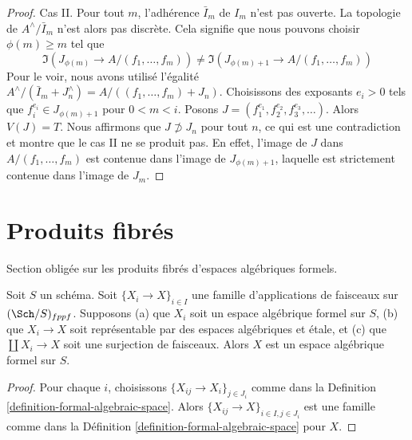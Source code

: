 \begin{proof}
\medskip\noindent
Cas II. Pour tout $m$, l'adhérence $\bar I_m$ de $I_m$ n'est pas ouverte.
La topologie de $A^\wedge/\bar I_m$ n'est alors pas discrète. Cela signifie
que nous pouvons choisir $\phi(m) \geq m$ tel que
$$
\Im(J_{\phi(m)} \to A/(f_1, \ldots, f_m)) \not =
\Im(J_{\phi(m) + 1} \to A/(f_1, \ldots, f_m))
$$
Pour le voir, nous avons utilisé l'égalité
$A^\wedge/(\bar I_m + J_n^\wedge) = A/((f_1, \ldots, f_m) + J_n)$.
Choisissons des exposants $e_i > 0$ tels que $f_i^{e_i} \in J_{\phi(m) + 1}$
pour $0 < m < i$. Posons $J = (f_1^{e_1}, f_2^{e_2}, f_3^{e_3}, \ldots)$.
Alors $V(J) = T$. Nous affirmons que $J \not \supset J_n$ pour tout $n$,
ce qui est une contradiction et montre que le cas II ne se produit pas.
En effet, l'image de $J$ dans $A/(f_1, \ldots, f_m)$ est contenue
dans l'image de $J_{\phi(m) + 1}$, laquelle est strictement contenue dans
l'image de $J_m$.
\end{proof}
















\section{Produits fibrés}
\label{section-fibre-products}

\noindent
Section obligée sur les produits fibrés d'espaces algébriques formels.

\begin{lemma}
\label{lemma-etale-covering-by-formal-algebraic-spaces}
Soit $S$ un schéma. Soit $\{X_i \to X\}_{i \in I}$ une famille d'applications
de faisceaux sur $(\Sch/S)_{fppf}$. Supposons (a) que $X_i$ soit un
espace algébrique formel sur $S$, (b) que $X_i \to X$ soit représentable
par des espaces algébriques et étale, et (c) que $\coprod X_i \to X$
soit une surjection de faisceaux. Alors $X$ est un espace algébrique formel
sur $S$.
\end{lemma}

\begin{proof}
Pour chaque $i$, choisissons $\{X_{ij} \to X_i\}_{j \in J_i}$ comme dans la
Definition \ref{definition-formal-algebraic-space}.
Alors $\{X_{ij} \to X\}_{i \in I, j \in J_i}$ est une famille
comme dans la Définition \ref{definition-formal-algebraic-space}
pour $X$.
\end{proof}

